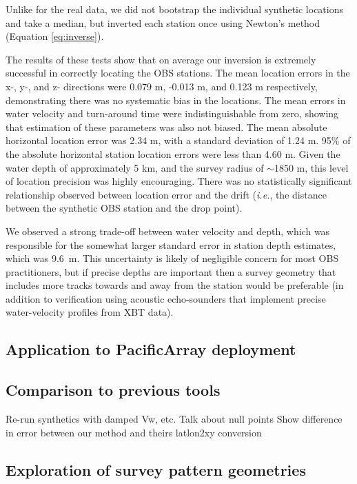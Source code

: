 Unlike for the real data, we did not bootstrap the individual synthetic locations and take a median, but inverted each station once using Newton's method (Equation \ref{eq:inverse}).   

The results of these tests show that on average our inversion is extremely successful in correctly locating the OBS stations. The mean location errors in the x-, y-, and z- directions were 0.079 m, -0.013 m, and 0.123 m respectively, demonstrating there was no systematic bias in the locations. The mean errors in water velocity and turn-around time were indistinguishable from zero, showing that estimation of these parameters was also not biased. The mean absolute horizontal location error was 2.34 m, with a standard deviation of 1.24 m. 95\% of the absolute horizontal station location errors were less than 4.60 m. Given the water depth of approximately 5 km, and the survey radius of $\sim$1850 m, this level of location precision was highly encouraging. There was no statistically significant relationship observed between location error and the drift (\textit{i.e.}, the distance between the synthetic OBS station and the drop point).

We observed a strong trade-off between water velocity and depth, which was responsible for the somewhat larger standard error in station depth estimates, which was \mbox{9.6 m}. This uncertainty is likely of negligible concern for most OBS practitioners, but if precise depths are important then a survey geometry that includes more tracks towards and away from the station would be preferable (in addition to verification using acoustic echo-sounders that implement precise water-velocity profiles from XBT data).

\subsection{Application to PacificArray deployment}

\subsection{Comparison to previous tools}
Re-run synthetics with damped Vw, etc.
Talk about null points
Show difference in error between our method and theirs
latlon2xy conversion


\subsection{Exploration of survey pattern geometries} \label{sec:surv_geom_tests}